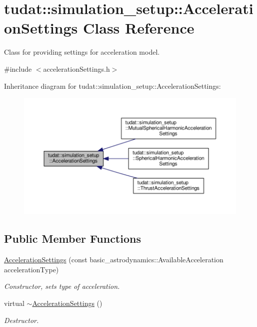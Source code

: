 \hypertarget{classtudat_1_1simulation__setup_1_1AccelerationSettings}{}\section{tudat\+:\+:simulation\+\_\+setup\+:\+:Acceleration\+Settings Class Reference}
\label{classtudat_1_1simulation__setup_1_1AccelerationSettings}


Class for providing settings for acceleration model.  




{\ttfamily \#include $<$acceleration\+Settings.\+h$>$}



Inheritance diagram for tudat\+:\+:simulation\+\_\+setup\+:\+:Acceleration\+Settings\+:
\nopagebreak
\begin{figure}[H]
\begin{center}
\leavevmode
\includegraphics[width=350pt]{classtudat_1_1simulation__setup_1_1AccelerationSettings__inherit__graph}
\end{center}
\end{figure}
\subsection*{Public Member Functions}
\begin{DoxyCompactItemize}
\item 
\hyperlink{classtudat_1_1simulation__setup_1_1AccelerationSettings_a61a6c91bf73a293adb523ebe2b71f379}{Acceleration\+Settings} (const basic\+\_\+astrodynamics\+::\+Available\+Acceleration acceleration\+Type)
\begin{DoxyCompactList}\small\item\em Constructor, sets type of acceleration. \end{DoxyCompactList}\item 
virtual \hyperlink{classtudat_1_1simulation__setup_1_1AccelerationSettings_a66bf9df8526ebaf6ed16a1100811a3ef}{$\sim$\+Acceleration\+Settings} ()\hypertarget{classtudat_1_1simulation__setup_1_1AccelerationSettings_a66bf9df8526ebaf6ed16a1100811a3ef}{}\label{classtudat_1_1simulation__setup_1_1AccelerationSettings_a66bf9df8526ebaf6ed16a1100811a3ef}

\begin{DoxyCompactList}\small\item\em Destructor. \end{DoxyCompactList}\end{DoxyCompactItemize}

